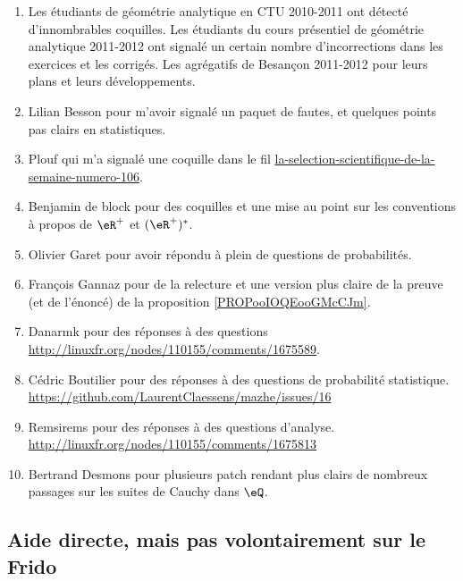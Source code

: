 \begin{enumerate}
    \item
        Les étudiants de géométrie analytique en CTU 2010-2011 ont détecté d'innombrables coquilles. Les étudiants du cours présentiel de géométrie analytique 2011-2012 ont signalé un certain nombre d'incorrections dans les exercices et les corrigés. Les agrégatifs de Besançon 2011-2012 pour leurs plans et leurs développements.
    \item
        Lilian Besson pour m'avoir signalé un paquet de fautes, et quelques points pas clairs en statistiques.
    \item
        Plouf qui m'a signalé une coquille dans le fil \href{http://passeurdesciences.blog.lemonde.fr/2014/01/24/la-selection-scientifique-de-la-semaine-numero-106}{la-selection-scientifique-de-la-semaine-numero-106}.
    \item
        Benjamin de block pour des coquilles et une mise au point sur les conventions à propos de \( \eR^+\) et \( (\eR^+)^*\).
    \item
        Olivier Garet pour avoir répondu à plein de questions de probabilités.
    \item
        François Gannaz pour de la relecture et une version plus claire de la preuve (et de l'énoncé) de la proposition \ref{PROPooIOQEooGMcCJm}.
    \item
        Danarmk pour des réponses à des questions \url{http://linuxfr.org/nodes/110155/comments/1675589}.
    \item
        Cédric Boutilier pour des réponses à des questions de probabilité statistique. \url{https://github.com/LaurentClaessens/mazhe/issues/16}
    \item
        Remsirems pour des réponses à des questions d'analyse. \url{http://linuxfr.org/nodes/110155/comments/1675813}
    \item
        Bertrand Desmons pour plusieurs patch rendant plus clairs de nombreux passages sur les suites de Cauchy dans \( \eQ\).
\end{enumerate}

\subsection{Aide directe, mais pas volontairement sur le Frido}

